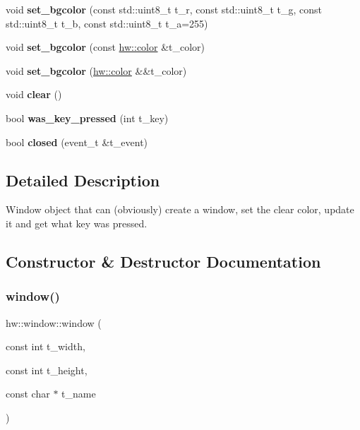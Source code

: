 \begin{DoxyCompactItemize}
\mbox{\label{classhw_1_1window_a90dc572e29ff0ee9c12b4bb78ee3d6f7}} 
void {\bfseries set\+\_\+bgcolor} (const std\+::uint8\+\_\+t t\+\_\+r, const std\+::uint8\+\_\+t t\+\_\+g, const std\+::uint8\+\_\+t t\+\_\+b, const std\+::uint8\+\_\+t t\+\_\+a=255)
\item 
\mbox{\label{classhw_1_1window_ae8e16d8c766889e7830e48845f5011d7}} 
void {\bfseries set\+\_\+bgcolor} (const \mbox{\hyperlink{structhw_1_1color}{hw\+::color}} \&t\+\_\+color)
\item 
\mbox{\label{classhw_1_1window_a08d4b8573fdc679868a6f202136f4832}} 
void {\bfseries set\+\_\+bgcolor} (\mbox{\hyperlink{structhw_1_1color}{hw\+::color}} \&\&t\+\_\+color)
\item 
\mbox{\label{classhw_1_1window_ad2c969819096a038667fa6bd970593f5}} 
void {\bfseries clear} ()
\item 
\mbox{\label{classhw_1_1window_a1004fcf6e277ff1ca2d6dcb2c93d4649}} 
bool {\bfseries was\+\_\+key\+\_\+pressed} (int t\+\_\+key)
\item 
\mbox{\label{classhw_1_1window_a7d794de03d1567a46ed4b411e876c4a2}} 
bool {\bfseries closed} (event\+\_\+t \&t\+\_\+event)
\end{DoxyCompactItemize}


\subsection{Detailed Description}
Window object that can (obviously) create a window, set the clear color, update it and get what key was pressed. 

\subsection{Constructor \& Destructor Documentation}
\mbox{\label{classhw_1_1window_a762764c6be092da20087eeabcd59f6f6}} 
\subsubsection{\texorpdfstring{window()}{window()}}
{\footnotesize\ttfamily hw\+::window\+::window (\begin{DoxyParamCaption}\item[{const int}]{t\+\_\+width,  }\item[{const int}]{t\+\_\+height,  }\item[{const char $\ast$}]{t\+\_\+name }\end{DoxyParamCaption})}



